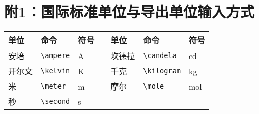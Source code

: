 \section{附1：国际标准单位与导出单位输入方式}\label{section7-4}

\begin{table}[htbp]
\centering{}
\label{tab.6d}
\begin{tabular}{lllp{10pt}lll}
\toprule
单位    & 命令  & 符号  &   & 单位    & 命令  & 符号  \\
\midrule
安培    & \verb|\ampere|    & \si{\ampere}   && 坎德拉  & \verb|\candela|   & \si{\candela}  \\
开尔文  & \verb|\kelvin|    & \si{\kelvin}   && 千克    & \verb|\kilogram|  & \si{\kilogram}    \\
米      & \verb|\meter|     & \si{\meter}    && 摩尔    & \verb|\mole|      & \si{\mole}    \\
秒      & \verb|\second|    & \si{\second}   &&     &        &      \\
\bottomrule
\end{tabular}
\end{table}

